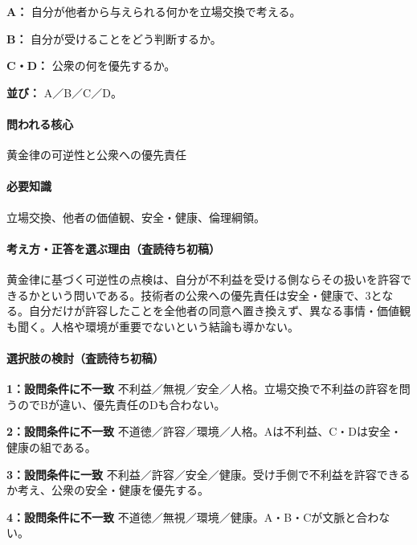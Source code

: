 \noindent\textbf{A：} 自分が他者から与えられる何かを立場交換で考える。\par

\noindent\textbf{B：} 自分が受けることをどう判断するか。\par

\noindent\textbf{C・D：} 公衆の何を優先するか。\par

\noindent\textbf{並び：} A／B／C／D。\par

\paragraph{問われる核心} 黄金律の可逆性と公衆への優先責任

\paragraph{必要知識} 立場交換、他者の価値観、安全・健康、倫理綱領。

\paragraph{考え方・正答を選ぶ理由（査読待ち初稿）} 黄金律に基づく可逆性の点検は、自分が不利益を受ける側ならその扱いを許容できるかという問いである。技術者の公衆への優先責任は安全・健康で、3となる。自分だけが許容したことを全他者の同意へ置き換えず、異なる事情・価値観も聞く。人格や環境が重要でないという結論も導かない。

\paragraph{選択肢の検討（査読待ち初稿）}\mbox{}\par

\noindent\textbf{1：設問条件に不一致} 不利益／無視／安全／人格。立場交換で不利益の許容を問うのでBが違い、優先責任のDも合わない。\par

\noindent\textbf{2：設問条件に不一致} 不道徳／許容／環境／人格。Aは不利益、C・Dは安全・健康の組である。\par

\noindent\textbf{3：設問条件に一致} 不利益／許容／安全／健康。受け手側で不利益を許容できるか考え、公衆の安全・健康を優先する。\par

\noindent\textbf{4：設問条件に不一致} 不道徳／無視／環境／健康。A・B・Cが文脈と合わない。\par

